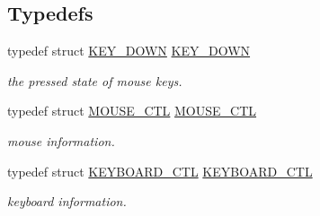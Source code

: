 \subsection*{Typedefs}
\begin{DoxyCompactItemize}
\item 
typedef struct \hyperlink{struct_k_e_y___d_o_w_n}{K\+E\+Y\+\_\+\+D\+O\+W\+N} \hyperlink{group__keyboard__mousse_gac3cb28f52c35738da3198d6e6af3103d}{K\+E\+Y\+\_\+\+D\+O\+W\+N}
\begin{DoxyCompactList}\small\item\em the pressed state of mouse keys. \end{DoxyCompactList}\item 
typedef struct \hyperlink{struct_m_o_u_s_e___c_t_l}{M\+O\+U\+S\+E\+\_\+\+C\+T\+L} \hyperlink{group__keyboard__mousse_gaea67189c062822a09168edbef65e1fe7}{M\+O\+U\+S\+E\+\_\+\+C\+T\+L}
\begin{DoxyCompactList}\small\item\em mouse information. \end{DoxyCompactList}\item 
typedef struct \hyperlink{struct_k_e_y_b_o_a_r_d___c_t_l}{K\+E\+Y\+B\+O\+A\+R\+D\+\_\+\+C\+T\+L} \hyperlink{group__keyboard__mousse_gabf8195274ea750bccb5b26a7f706151d}{K\+E\+Y\+B\+O\+A\+R\+D\+\_\+\+C\+T\+L}
\begin{DoxyCompactList}\small\item\em keyboard information. \end{DoxyCompactList}\end{DoxyCompactItemize}
